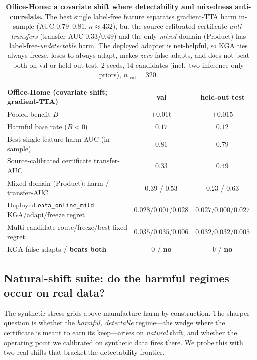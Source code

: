 \documentclass[conference]{IEEEtran}
\theoremstyle{plain}
\theoremstyle{definition}
\begin{document}
\begin{table}[!ht]
\centering
\small
{%
\begin{tabular}{lcc}
\toprule
Office-Home (covariate shift; gradient-TTA) & val & held-out test \\
\midrule
Pooled benefit $\bar B$ & $+0.016$ & $+0.015$ \\
Harmful base rate ($B<0$) & $0.17$ & $0.12$ \\
Best single-feature harm-AUC (in-sample) & $0.81$ & $0.79$ \\
Source-calibrated certificate transfer-AUC & $0.33$ & $0.49$ \\
Mixed domain (Product): harm / transfer-AUC & $0.39$ / $0.53$ & $0.23$ / $0.63$ \\
Deployed \texttt{eata\_online\_mild}: \textsc{KGA}/adapt/freeze regret & $0.028/0.001/0.028$ & $0.027/0.000/0.027$ \\
Multi-candidate route/freeze/best-fixed regret & $0.035/0.035/0.006$ & $0.032/0.032/0.005$ \\
\textsc{KGA} false-adapts \;/\; \textbf{beats both} & $0$ \;/\; \textbf{no} & $0$ \;/\; \textbf{no} \\
\bottomrule
\end{tabular}}
\caption{\textbf{Office-Home: a covariate shift where detectability and mixedness anti-correlate.}
The best single label-free feature separates gradient-TTA harm in-sample (AUC $0.79$--$0.81$,
$n{\approx}432$), but the source-calibrated certificate \emph{anti-transfers} (transfer-AUC
$0.33$/$0.49$) and the only \emph{mixed} domain (Product) has label-free-\emph{undetectable} harm.
The deployed adapter is net-helpful, so \textsc{KGA} ties always-freeze, loses to always-adapt,
makes \emph{zero} false-adapts, and does not beat both on val or held-out test. $2$ seeds, $14$
candidates (incl.\ two inference-only priors), $n_{\mathrm{eval}}{=}320$.}
\label{tab:officehome}
\end{table}

\clearpage
\subsection{Natural-shift suite: do the harmful regimes occur on real data?}\label{sec:natural-suite}
The synthetic stress grids above manufacture harm by construction. The sharper question is whether
the \emph{harmful, detectable} regime---the wedge where the certificate is meant to earn its
keep---arises on \emph{natural} shift, and whether the operating point we calibrated on synthetic
data fires there. We probe this with two real shifts that bracket the detectability frontier.
\end{document}
